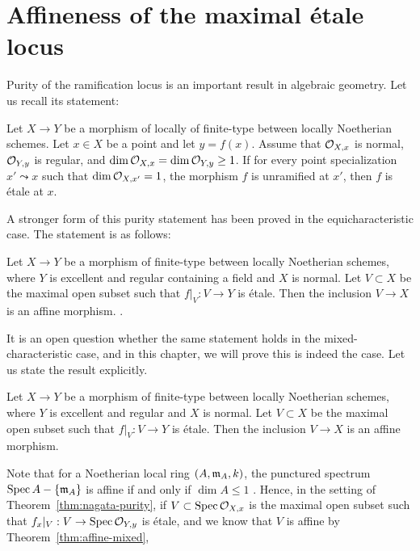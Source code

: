 \chapter{Affineness of the maximal \'{e}tale locus}\label{chapter:affine}

Purity of the ramification locus is an important result in algebraic geometry. Let us recall its statement:
\begin{theorem}\label{thm:nagata-purity}
Let $X \to Y$ be a morphism of locally of finite-type between locally Noetherian schemes. Let $x \in X$ be a point and let $y = f(x)$. 
Assume that $\cal{O}_{X,x}$ is normal, $\cal{O}_{Y,y}$ is regular, and $\dim \cal{O}_{X,x} = \dim \cal{O}_{Y,y}\ge 1$. 
If for every point specialization $x' \leadsto x$ such that $\dim \cal{O}_{X,x'} = 1$, the morphism $f$ is unramified at $x'$, 
then $f$ is \'{e}tale at $x$. \cite[0EA4]{sp}
\end{theorem}
A stronger form of this purity statement has been proved in the equicharacteristic case. The statement is as follows:
\begin{theorem}\label{thm:affine-equi}
Let $X \to Y$ be a morphism of finite-type between locally Noetherian schemes, where $Y$ is excellent and regular containing a field and 
$X$ is normal. Let $V \subset X$ be the maximal open subset such that $f|_V: V \to Y$ is \'{e}tale. 
Then the inclusion $V \to X$ is an affine morphism. \cite[0ECD]{sp}.
\end{theorem}
It is an open question whether the same statement holds in the mixed-characteristic case, and in this chapter, we will prove this is indeed the case.
Let us state the result explicitly.
\begin{theorem}\label{thm:affine-mixed}
Let $X \to Y$ be a morphism of finite-type between locally Noetherian schemes, where $Y$ is excellent and regular and 
$X$ is normal. Let $V \subset X$ be the maximal open subset such that $f|_V: V \to Y$ is \'{e}tale. 
Then the inclusion $V \to X$ is an affine morphism.
\end{theorem}
Note that for a Noetherian local ring $(A,\ideal{m}_A, k)$, the punctured spectrum $\spec{A} - \{\ideal{m}_A\}$ is affine if and only if $\dim{A}\le 1$ \cite[0BRC]{sp}.
Hence, in the setting of Theorem~\ref{thm:nagata-purity}, if $V \subset \spec{\cal{O}_{X,x}}$ 
is the maximal open subset such that $f_{x}|_V: V \to \spec{\cal{O}_{Y,y}}$ is \'{e}tale, and we know that $V$ is affine by Theorem~\ref{thm:affine-mixed},
